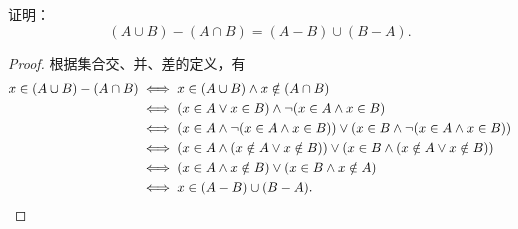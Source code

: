 \begin{example}
证明：\begin{equation}
	(A \cup B) - (A \cap B) = (A-B)\cup(B-A).
\end{equation}
\begin{proof}
根据集合交、并、差的定义，有
\begin{align*}
	x \in (A \cup B) - (A \cap B)
	&\iff x \in (A \cup B) \land x \notin (A \cap B) \\
	&\iff (x \in A \lor x \in B) \land \neg(x \in A \land x \in B) \\
	&\iff (x \in A \land \neg(x \in A \land x \in B))
	 \lor (x \in B \land \neg(x \in A \land x \in B)) \\
	&\iff (x \in A \land (x \notin A \lor x \notin B))
	 \lor (x \in B \land (x \notin A \lor x \notin B)) \\
	&\iff (x \in A \land x \notin B) \lor (x \in B \land x \notin A) \\
	&\iff x \in (A-B)\cup(B-A).
\qedhere
\end{align*}
\end{proof}
\end{example}
